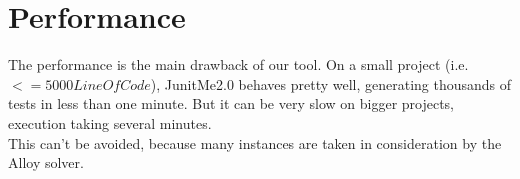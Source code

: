 \section{Performance}
\label{sec:Performance}
	The performance is the main drawback of our tool. On a small project (i.e. $<= 5000 LineOfCode$), JunitMe2.0 behaves pretty well, generating thousands of tests in less than one minute. But it can be very slow on bigger projects, execution taking several minutes.\\
	This can't be avoided, because many instances are taken in consideration by the Alloy solver.